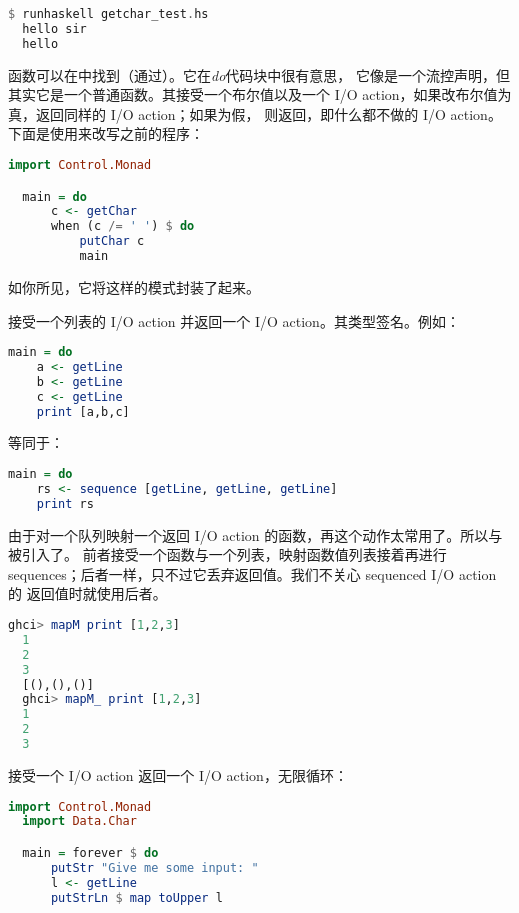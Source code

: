 \documentclass[./main.tex]{subfiles}
\begin{document}
\begin{lstlisting}[language=Haskell]
  $ runhaskell getchar_test.hs
  hello sir
  hello
\end{lstlisting}

函数可以在中找到（通过）。它在\textit{do}代码块中很有意思，
它像是一个流控声明，但其实它是一个普通函数。其接受一个布尔值以及一个 I/O action，如果改布尔值为真，返回同样的 I/O action；如果为假，
则返回，即什么都不做的 I/O action。下面是使用来改写之前的程序：

\begin{lstlisting}[language=Haskell]
  import Control.Monad

  main = do
      c <- getChar
      when (c /= ' ') $ do
          putChar c
          main
\end{lstlisting}

如你所见，它将这样的模式封装了起来。

接受一个列表的 I/O action 并返回一个 I/O action。其类型签名。例如：

\begin{lstlisting}[language=Haskell]
  main = do
    a <- getLine
    b <- getLine
    c <- getLine
    print [a,b,c]
\end{lstlisting}

等同于：

\begin{lstlisting}[language=Haskell]
  main = do
    rs <- sequence [getLine, getLine, getLine]
    print rs
\end{lstlisting}

由于对一个队列映射一个返回 I/O action 的函数，再这个动作太常用了。所以与被引入了。
前者接受一个函数与一个列表，映射函数值列表接着再进行 sequences；后者一样，只不过它丢弃返回值。我们不关心 sequenced I/O action 的
返回值时就使用后者。

\begin{lstlisting}[language=Haskell]
  ghci> mapM print [1,2,3]
  1
  2
  3
  [(),(),()]
  ghci> mapM_ print [1,2,3]
  1
  2
  3
\end{lstlisting}

接受一个 I/O action 返回一个 I/O action，无限循环：

\begin{lstlisting}[language=Haskell]
  import Control.Monad
  import Data.Char

  main = forever $ do
      putStr "Give me some input: "
      l <- getLine
      putStrLn $ map toUpper l
\end{lstlisting}
\end{document}

